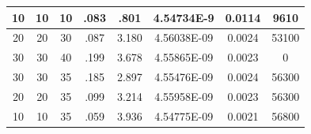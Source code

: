 \documentclass{article}
\begin{document}
\begin{table}
\begin{center}
\begin{tabular}{|c|c|c|c|c|c|c|c|}
10 & 10 & 10 & .083 & .801 & 4.54734E-9  & 0.0114 & 9610 \\ \hline
20 & 20 & 30 & .087 & 3.180 & 4.56038E-09  & 0.0024 & 53100 \\ \hline
30 & 30 & 40 & .199 & 3.678 & 4.55865E-09  & 0.0023 & 0 \\ \hline
30 & 30 & 35 & .185 & 2.897 & 4.55476E-09  & 0.0024 & 56300 \\ \hline
20 & 20 & 35 & .099 & 3.214 & 4.55958E-09  & 0.0023 & 56300 \\ \hline
10 & 10 & 35 & .059 & 3.936 & 4.54775E-09  & 0.0021 & 56800 \\ \hline
\end{tabular}
\end{center}
\end{table}



{}

\end{document}
